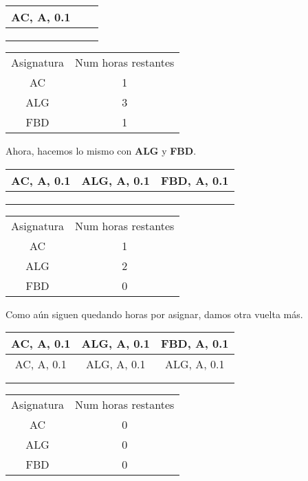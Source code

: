 \begin{minipage}{0.5\textwidth}    
\begin{tabular}{| c | c | c |}
\hline
AC, A, 0.1 &  &  \\
 \hline
 &  &  \\
 \hline
 &  &  \\
 \hline
 &  &  \\
 \hline 
\end{tabular}
\end{minipage}
\begin{minipage}{0.5\textwidth}
\begin{tabular}{c | c}
Asignatura & Num horas restantes \\
AC & 1 \\
ALG & 3 \\
FBD & 1
\end{tabular}
\end{minipage}

Ahora, hacemos lo mismo con \textbf{ALG} y \textbf{FBD}.

\begin{minipage}{0.5\textwidth}    
\begin{tabular}{| c | c | c |}
\hline
AC, A, 0.1 & ALG, A, 0.1  & FBD, A, 0.1 \\
 \hline
 &  &  \\
 \hline
 &  &  \\
 \hline
 &  &  \\
 \hline 
\end{tabular}
\end{minipage}
\begin{minipage}{0.5\textwidth}
\begin{tabular}{c | c}
Asignatura & Num horas restantes \\
AC & 1 \\
ALG & 2 \\
FBD & 0
\end{tabular}
\end{minipage}

Como aún siguen quedando horas por asignar, damos otra vuelta más.

\begin{minipage}{0.5\textwidth}    
\begin{tabular}{| c | c | c |}
\hline
AC, A, 0.1 & ALG, A, 0.1  & FBD, A, 0.1 \\
 \hline
AC, A, 0.1 & ALG, A, 0.1 & ALG, A, 0.1  \\
 \hline
 &  &  \\
 \hline
 &  &  \\
 \hline 
\end{tabular}
\end{minipage}
\begin{minipage}{0.5\textwidth}
\begin{tabular}{c | c}
Asignatura & Num horas restantes \\
AC & 0 \\
ALG & 0 \\
FBD & 0
\end{tabular}
\end{minipage}

